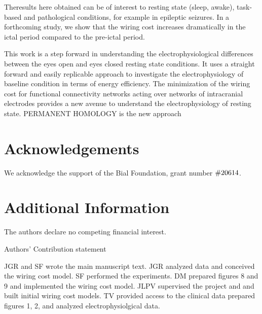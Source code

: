 \documentclass[11pt, onecolumn]{article}
\begin{document}
Theresults here obtained can be of interest to resting state (sleep, awake), task-based and pathological conditions, for example in epileptic seizures. In a forthcoming study, we show that the wiring cost increases dramatically in the ictal period compared to the pre-ictal period.   

This work is a step forward in understanding the electrophysiological differences between the eyes open and eyes closed resting state conditions. It uses a straight forward and easily replicable approach to investigate the electrophysiology of baseline condition in terms of energy efficiency. The minimization of the wiring cost for functional connectivity networks acting over networks of intracranial electrodes provides a new avenue to understand the electrophysiology of resting state. PERMANENT HOMOLOGY is the new approach


\section*{Acknowledgements}
We acknowledge the support of the Bial Foundation, grant number  $\#206\/14$.
\section*{Additional Information}
The authors declare no competing financial interest.


%



Authors' Contribution statement

JGR and SF wrote the main manuscript text. JGR analyzed data and conceived the wiring cost model. SF performed the experiments. DM prepared figures 8 and 9 and implemented the wiring cost model. JLPV supervised the project and and built initial wiring cost models. TV provided access to the clinical data prepared figures 1, 2, and analyzed electrophysiolgical data.
\end{document}
